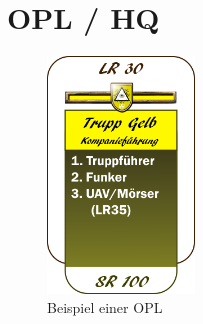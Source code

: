 \section{\acf{OPL} / \acf{HQ}}
\begin{figure}
	\centering 
	\includegraphics[width=0.35\textwidth]{./img/truppenordnung/opl/opl.png}
	\caption{Beispiel einer \ac{OPL}}
\end{figure}	

